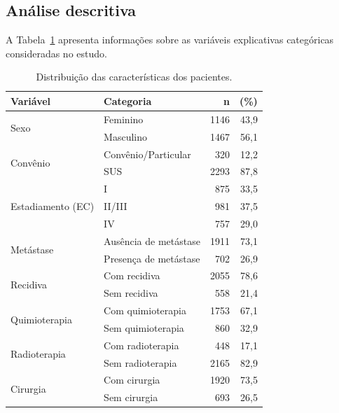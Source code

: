 \documentclass[11pt,a4paper]{article}
\begin{document}
\subsection{Análise descritiva}

A Tabela~\ref{tab:descritiva_categorica} apresenta informações sobre as variáveis explicativas categóricas consideradas no estudo. 

\begin{table}[H]
\centering
\caption{Distribuição das características dos pacientes.}
\label{tab:descritiva_categorica}
\begin{tabular}{llrr}
\toprule
\textbf{Variável} & \textbf{Categoria} & \textbf{n} & \textbf{(\%)} \\
\midrule

\multirow{2}{*}{Sexo}
& Feminino  & 1146 & 43,9 \\
& Masculino & 1467 & 56,1 \\

\multirow{2}{*}{Convênio}
& Convênio/Particular & 320  & 12,2 \\
& SUS                & 2293 & 87,8 \\[2pt]

\multirow{3}{*}{Estadiamento (EC)}
& I      & 875 & 33,5 \\
& II/III & 981 & 37,5 \\
& IV     & 757 & 29,0 \\[2pt]

\multirow{2}{*}{Metástase}
& Ausência de metástase & 1911 & 73,1 \\
& Presença de metástase & 702  & 26,9 \\[2pt]

\multirow{2}{*}{Recidiva}
& Com recidiva & 2055 & 78,6 \\
& Sem recidiva & 558  & 21,4 \\[2pt]

\multirow{2}{*}{Quimioterapia}
& Com quimioterapia & 1753 & 67,1 \\
& Sem quimioterapia & 860  & 32,9 \\[2pt]

\multirow{2}{*}{Radioterapia}
& Com radioterapia & 448  & 17,1 \\
& Sem radioterapia & 2165 & 82,9 \\[2pt]

\multirow{2}{*}{Cirurgia}
& Com cirurgia & 1920 & 73,5 \\
& Sem cirurgia & 693  & 26,5 \\[2pt]


\bottomrule
\end{tabular}
\end{table}
\end{document}
